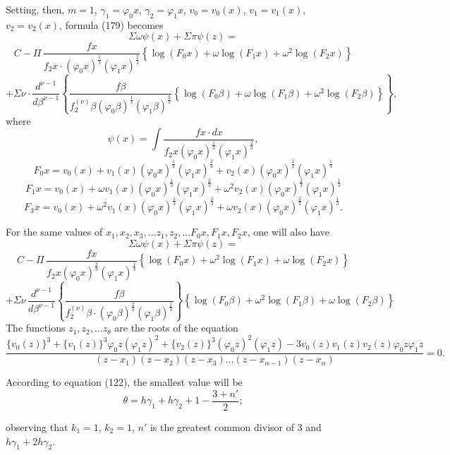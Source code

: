\documentclass{article}
\begin{document}
Setting, then, $m = 1$, $\gamma_1 = \varphi_0 x$, $\gamma_2 = \varphi_1 x$, $v_0 = v_0(x)$, $v_1 = v_1(x)$, $v_2 = v_2(x)$, formula (179) becomes
\[ \Sigma\omega\psi(x)+\Sigma\pi\psi(z) = \]
\[ C-\Pi\,\frac{f x}{f_2 x \cdot (\varphi_0 x)^{\frac{1}{3}}(\varphi_1 x)^{\frac{2}{3}}}\left\{\log(F_0 x)+\omega\log(F_1 x)+\omega^{2}\log(F_2 x)\right\} \]
\[ + \Sigma\nu \cdot \frac{d^{\nu-1}}{d\beta^{\nu-1}} \left\{ \frac{f\beta}{f_2^{(\nu)}\beta(\varphi_0\beta)^{\frac{1}{3}}(\varphi_1\beta)^{\frac{2}{3}}}\left\{\log(F_0\beta)+\omega\log(F_1\beta)+\omega^{2}\log(F_2\beta)\right\} \right\}, \]
where
\[ \psi(x) = \int \frac{f x \cdot dx}{f_2 x(\varphi_0 x)^{\frac{1}{3}}(\varphi_1 x)^{\frac{2}{3}}}, \]
\[ F_0 x = v_0(x)+v_1(x)(\varphi_0 x)^{\frac{1}{3}}(\varphi_1 x)^{\frac{2}{3}}+v_2(x)(\varphi_0 x)^{\frac{2}{3}}(\varphi_1 x)^{\frac{1}{3}} \]
\[ F_1 x = v_0(x)+\omega v_1(x)(\varphi_0 x)^{\frac{1}{3}}(\varphi_1 x)^{\frac{2}{3}}+\omega^{2}v_2(x)(\varphi_0 x)^{\frac{2}{3}}(\varphi_1 x)^{\frac{1}{3}} \]
\[ F_3 x = v_0(x)+\omega^{2}v_1(x)(\varphi_0 x)^{\frac{1}{3}}(\varphi_1 x)^{\frac{2}{3}}+\omega v_2(x)(\varphi_0 x)^{\frac{2}{3}}(\varphi_1 x)^{\frac{1}{3}}. \]

For the same values of $x_1, x_2, x_3, \ldots z_1, z_2, \ldots F_0 x, F_1 x, F_2 x$, one will also have
\[ \Sigma\omega\psi(x)+\Sigma\pi\psi(z) = \]
\[ C-\Pi\,\frac{f x}{f_2 x(\varphi_0 x)^{\frac{2}{3}}(\varphi_1 x)^{\frac{1}{3}}}\left\{\log(F_0 x)+\omega^{2}\log(F_1 x)+\omega\log(F_2 x)\right\} \]
\[ + \Sigma\nu\,\frac{d^{\nu-1}}{d\beta^{\nu-1}} \left\{ \frac{f\beta}{f_2^{(\nu)}\beta \cdot (\varphi_0\beta)^{\frac{2}{3}}(\varphi_1\beta)^{\frac{1}{3}}} \right\} \left\{\log(F_0\beta)+\omega^{2}\log(F_1\beta)+\omega\log(F_2\beta)\right\} \]
The functions $z_1, z_2, \ldots z_\theta$ are the roots of the equation
\[ \frac{\{v_0(z)\}^{3}+\{v_1(z)\}^{3}\varphi_0 z(\varphi_1 z)^{2}+\{v_2(z)\}^{3}(\varphi_0 z)^{2}(\varphi_1 z)-3v_0(z)v_1(z)v_2(z)\varphi_0 z\varphi_1 z}{(z-x_1)(z-x_2)(z-x_3)\ldots(z-x_{\alpha-1})(z-x_\alpha)} = 0. \]

According to equation (122), the smallest value will be
\[ \theta = h\gamma_1+h\gamma_2+1-\frac{3+n'}{2}; \]

observing that $k_1=1$, $k_2=1$, $n'$ is the greatest common divisor of 3 and $h\gamma_1+2h\gamma_2$.
\end{document}
